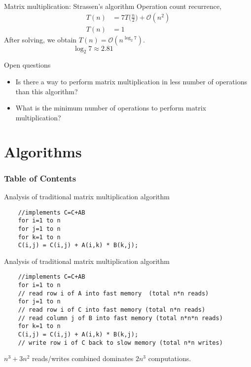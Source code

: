 \documentclass[
11pt, %
]{beamer}
\begin{document}
\begin{frame}{Matrix multiplication: Strassen's algorithm}
	Operation count recurrence,
	\begin{align*}
	T(n) &= 7T\big(\frac{n}{2}\big) + \mathcal{O}(n^2)\\
	T(n) &= 1
	\end{align*}
	After solving, we obtain $T(n) = \mathcal{O}(n^{\log_2 7})$.\\
	$\qquad\qquad\qquad\qquad\qquad\log_2 7 \approx 2.81$
	\begin{block}{Open questions}
		\begin{itemize}
			\item Is there a way to perform matrix multiplication in less number of operations than this algorithm?
			\item What is the minimum number of operations to perform matrix multiplication?
		\end{itemize}
	\end{block}
\end{frame}
\section{Algorithms}
\begin{frame}
	\frametitle{Table of Contents}
\end{frame}
\begin{frame}[fragile]{Analysis of traditional matrix multiplication algorithm}
	\begin{verbatim}
	//implements C=C+AB
	for i=1 to n
	for j=1 to n
	for k=1 to n
	C(i,j) = C(i,j) + A(i,k) * B(k,j);
	\end{verbatim}
\end{frame}

\begin{frame}[fragile]{Analysis of traditional matrix multiplication algorithm}
	\begin{verbatim}
	//implements C=C+AB
	for i=1 to n
	// read row i of A into fast memory  (total n*n reads) 
	for j=1 to n
	// read row i of C into fast memory (total n*n reads)
	// read column j of B into fast memory (total n*n*n reads)
	for k=1 to n
	C(i,j) = C(i,j) + A(i,k) * B(k,j);
	// write row i of C back to slow memory (total n*n writes)
	\end{verbatim}
	\medskip
	$n^3 + 3n^2$ reads/writes combined dominates $2n^3$ computations.
\end{frame}
\end{document}
